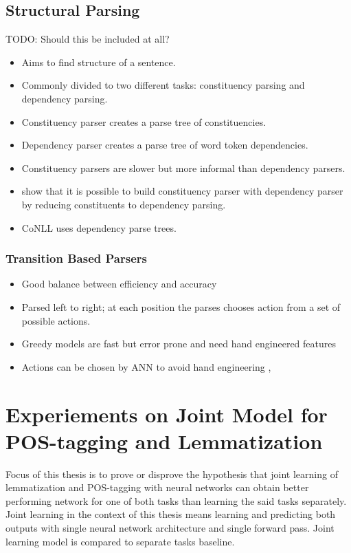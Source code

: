\documentclass[12pt,a4paper,english
]{tutthesis}
\newcommand\todo[1]{{\color{red}TODO: #1}} %
\begin{document}
\section{Structural Parsing}
\label{se:structural_parsing}
\todo{Should this be included at all?}
\begin{itemize}
\item Aims to find structure of a sentence.
\item Commonly divided to two different tasks: constituency parsing and dependency parsing.
\item Constituency parser creates a parse tree of constituencies.
\item Dependency parser creates a parse tree of word token dependencies.
\item Constituency parsers are slower but more informal than dependency parsers. \cite{Fernandez-Gonzalez2015}
\item \cite{Fernandez-Gonzalez2015} show that it is possible to build constituency parser with dependency parser by reducing constituents to dependency parsing.
\item CoNLL uses dependency parse trees.
\end{itemize}

\subsection{Transition Based Parsers}
\begin{itemize}
\item Good balance between efficiency and accuracy \cite{Weiss2015}
\item Parsed left to right; at each position the parses chooses action from a set of possible actions.
\item Greedy models are fast but error prone and need hand engineered features \cite{Weiss2015}
\item Actions can be chosen by ANN to avoid hand engineering \cite{Chen2014}, \cite{Weiss2015}
\end{itemize}


\chapter{Experiements on Joint Model for POS-tagging and Lemmatization}
\label{ch:experiements_on_joint_model_for_pos_tagging_and_lemmatization}
Focus of this thesis is to prove or disprove the hypothesis that joint learning of lemmatization and POS-tagging with neural networks can obtain better performing network for one of both tasks than learning the said tasks separately. Joint learning in the context of this thesis means learning and predicting both outputs with single neural network architecture and single forward pass. Joint learning model is compared to separate tasks baseline.
\end{document}
